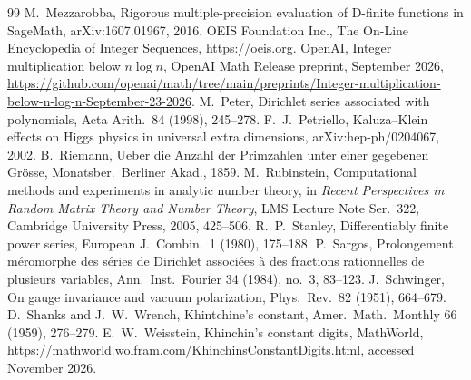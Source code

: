 \documentclass[11pt]{amsart}
\theoremstyle{definition}
\theoremstyle{remark}
\begin{document}
\begin{thebibliography}{99}
 M.~Mezzarobba, Rigorous multiple-precision evaluation of D-finite functions in SageMath, arXiv:1607.01967, 2016.
 OEIS Foundation Inc., The On-Line Encyclopedia of Integer Sequences, \url{https://oeis.org}.
 OpenAI, Integer multiplication below $n\log n$, OpenAI Math Release preprint, September 2026,
\url{https://github.com/openai/math/tree/main/preprints/Integer-multiplication-below-n-log-n-September-23-2026}.
 M.~Peter, Dirichlet series associated with polynomials, Acta Arith.\ 84 (1998), 245--278.
 F.~J.~Petriello, Kaluza--Klein effects on Higgs physics in universal extra dimensions, arXiv:hep-ph/0204067, 2002.
 B.~Riemann, Ueber die Anzahl der Primzahlen unter einer gegebenen Gr\"osse, Monatsber.\ Berliner Akad., 1859.
 M.~Rubinstein, Computational methods and experiments in analytic number theory, in \emph{Recent Perspectives in Random Matrix Theory and Number Theory}, LMS Lecture Note Ser.\ 322, Cambridge University Press, 2005, 425--506.
 R.~P.~Stanley, Differentiably finite power series, European J.\ Combin.\ 1 (1980), 175--188.
 P.~Sargos, Prolongement m\'eromorphe des s\'eries de Dirichlet associ\'ees \`a des fractions rationnelles de plusieurs variables, Ann.\ Inst.\ Fourier 34 (1984), no.~3, 83--123.
 J.~Schwinger, On gauge invariance and vacuum polarization, Phys.\ Rev.\ 82 (1951), 664--679.
 D.~Shanks and J.~W.~Wrench, Khintchine's constant, Amer.\ Math.\ Monthly 66 (1959), 276--279.
 E.~W.~Weisstein, Khinchin's constant digits, MathWorld, \url{https://mathworld.wolfram.com/KhinchinsConstantDigits.html}, accessed November 2026.
\end{thebibliography}
\end{document}

